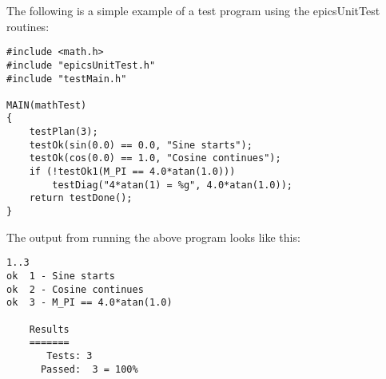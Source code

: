 The following is a simple example of a test program using the epicsUnitTest routines:

\begin{verbatim}
#include <math.h>
#include "epicsUnitTest.h"
#include "testMain.h"

MAIN(mathTest)
{
    testPlan(3);
    testOk(sin(0.0) == 0.0, "Sine starts");
    testOk(cos(0.0) == 1.0, "Cosine continues");
    if (!testOk1(M_PI == 4.0*atan(1.0)))
        testDiag("4*atan(1) = %g", 4.0*atan(1.0));
    return testDone();
}
\end{verbatim}

The output from running the above program looks like this:

\begin{verbatim}
1..3
ok  1 - Sine starts
ok  2 - Cosine continues
ok  3 - M_PI == 4.0*atan(1.0)

    Results
    =======
       Tests: 3
      Passed:  3 = 100%

\end{verbatim}
